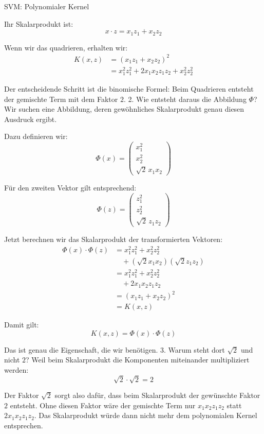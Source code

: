 \begin{frame}{SVM: Polynomialer Kernel}
{Ihr Skalarprodukt ist:
\[
x\cdot z=x_1z_1+x_2z_2
\]

Wenn wir das quadrieren, erhalten wir:
\[
\begin{aligned}
K(x,z)&=(x_1z_1+x_2z_2)^2\\
&=x_1^2z_1^2+2x_1x_2z_1z_2+x_2^2z_2^2
\end{aligned}
\]

Der entscheidende Schritt ist die binomische Formel: Beim Quadrieren entsteht der gemischte Term mit dem Faktor \(2\).
2. Wie entsteht daraus die Abbildung \(\Phi\)?
Wir suchen eine Abbildung, deren gewöhnliches Skalarprodukt genau diesen Ausdruck ergibt.

Dazu definieren wir:
\[
\boxed{
\Phi(x)=
\begin{pmatrix}
x_1^2\\
x_2^2\\
\sqrt{2}\,x_1x_2
\end{pmatrix}
}
\]

Für den zweiten Vektor gilt entsprechend:
\[
\Phi(z)=
\begin{pmatrix}
z_1^2\\
z_2^2\\
\sqrt{2}\,z_1z_2
\end{pmatrix}
\]

Jetzt berechnen wir das Skalarprodukt der transformierten Vektoren:
\[
\begin{aligned}
\Phi(x)\cdot\Phi(z)
&=x_1^2z_1^2+x_2^2z_2^2\\
&\quad+(\sqrt{2}x_1x_2)(\sqrt{2}z_1z_2)\\
&=x_1^2z_1^2+x_2^2z_2^2\\
&\quad+2x_1x_2z_1z_2\\
&=(x_1z_1+x_2z_2)^2\\
&=K(x,z)
\end{aligned}
\]

Damit gilt:
\[
\boxed{K(x,z)=\Phi(x)\cdot\Phi(z)}
\]

Das ist genau die Eigenschaft, die wir benötigen.
3. Warum steht dort \(\sqrt{2}\) und nicht \(2\)?
Weil beim Skalarprodukt die Komponenten miteinander multipliziert werden:
\[
\sqrt{2}\cdot\sqrt{2}=2
\]

Der Faktor \(\sqrt{2}\) sorgt also dafür, dass beim Skalarprodukt der gewünschte Faktor \(2\) entsteht.
Ohne diesen Faktor wäre der gemischte Term nur \(x_1x_2z_1z_2\) statt \(2x_1x_2z_1z_2\). Das Skalarprodukt würde dann nicht mehr dem polynomialen Kernel entsprechen.
}
\end{frame}

